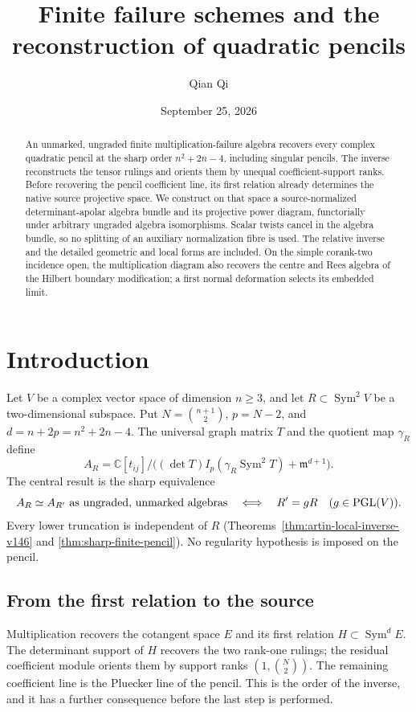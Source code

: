 \documentclass[11pt,reqno]{amsart}
\numberwithin{equation}{section}
\theoremstyle{definition}\newtheorem{definition}[theorem]{Definition}
\theoremstyle{remark}\newtheorem{remark}[theorem]{Remark}
\newcommand{\C}{\mathbb C}\newcommand{\Q}{\mathbb Q}
\DeclareMathOperator{\Sym}{Sym}\DeclareMathOperator{\Gr}{Gr}
\begin{document}
\title{Finite failure schemes and the reconstruction of quadratic pencils}
\author{Qian Qi}
\date{September 25, 2026}
\begin{abstract}
An unmarked, ungraded finite multiplication-failure algebra recovers
every complex quadratic pencil at the sharp order $n^2+2n-4$, including
singular pencils. The inverse reconstructs the tensor rulings and
orients them by unequal coefficient-support ranks. Before recovering
the pencil coefficient line, its first relation already determines
the native source projective space. We construct on that space a
source-normalized determinant-apolar algebra bundle and its projective
power diagram, functorially under arbitrary ungraded algebra
isomorphisms. Scalar twists cancel in the algebra bundle, so no
splitting of an auxiliary normalization fibre is used. The relative
inverse and the detailed geometric and local forms are included. On the simple corank-two incidence open, the
multiplication diagram also recovers the centre and Rees algebra of
the Hilbert boundary modification; a first normal deformation selects
its embedded limit.
\end{abstract}
\maketitle
\section{Introduction}
\label{sec:paper-i-v158}
Let $V$ be a complex vector space of dimension $n\geq3$, and let
$R\subset\Sym^2V$ be a two-dimensional subspace. Put
$N=\binom{n+1}{2}$, $p=N-2$, and $d=n+2p=n^2+2n-4$.
The universal graph matrix $T$ and the quotient map $\gamma_R$ define
\[
 A_R=\C[t_{ij}]/\bigl((\det T)I_p(\gamma_R\Sym^2T)
                                      +\mathfrak m^{d+1}\bigr).
\]
The central result is the sharp equivalence
\[
 A_R\simeq A_{R'}\text{ as ungraded, unmarked algebras}
 \quad\Longleftrightarrow\quad R'=gR\quad(g\in\operatorname{PGL}(V)).
\]
Every lower truncation is independent of $R$
(Theorems~\ref{thm:artin-local-inverse-v146} and
\ref{thm:sharp-finite-pencil}). No regularity hypothesis is imposed
on the pencil.

\subsection{From the first relation to the source}
Multiplication recovers the cotangent space $E$ and its first relation
$H\subset\Sym^dE$. The determinant support of $H$ recovers the two
rank-one rulings; the residual coefficient module orients them by
support ranks $(1,\binom N2)$. The remaining coefficient line is the
Pluecker line of the pencil. This is the order of the inverse, and it
has a further consequence before the last step is performed.
\end{document}
